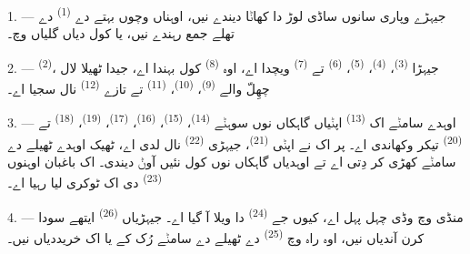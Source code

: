 %

\VUsaut{4.0mm}
\VUsaut{3.0mm}

\VUsaut{3.0mm}

1. --- جیہڑے وپاری سانوں ساڈی لوڑ دا کھاݨا دیندے نیں، اوہناں وچوں بہتے
 دے  \textsuperscript{(1)} دے تھلے جمع رہندے نیں، یا
کول دیاں گلیاں وچ۔

2. ---  \textsuperscript{(2)}، جیہڑا 
\textsuperscript{(3)}،  \textsuperscript{(4)}، 
\textsuperscript{(5)}،  \textsuperscript{(6)} تے
 \textsuperscript{(7)} ویچدا اے، اوہ 
\textsuperscript{(8)} کول بہندا اے، جیدا ٹھیلا لال چھِلّ والے
 \textsuperscript{(9)}، 
\textsuperscript{(10)}،  \textsuperscript{(11)} تے تازے
 \textsuperscript{(12)} نال سجیا اے۔

3. --- اوہدے سامݨے اک  \textsuperscript{(13)} اپݨیاں
گاہکاں نوں سوہݨے  \textsuperscript{(14)}، 
\textsuperscript{(15)}،  \textsuperscript{(16)}، 
\textsuperscript{(17)}،  \textsuperscript{(19)}، 
\textsuperscript{(18)} تے  \textsuperscript{(20)} تیکر وکھاندی اے۔ پر
اک  نے اپݨی  \textsuperscript{(21)}، جیہڑی
 \textsuperscript{(22)} نال لدی اے، ٹھیک اوہدے ٹھیلے دے سامݨے
کھڑی کر دِتی اے تے اوہدیاں گاہکاں نوں کول نئیں آوݨ دیندی۔ اک باغبان اوہنوں
 \textsuperscript{(23)} دی اک ٹوکری لیا رہیا اے۔

\VUsaut{4.0mm}
\VUsaut{3.0mm}

4. --- منڈی وچ وڈی چہل پہل اے، کیوں جے  \textsuperscript{(24)} دا
ویلا آ گیا اے۔ جیہڑیاں  \textsuperscript{(26)} ایتھے سودا کرن
آندیاں نیں، اوہ راہ وچ  \textsuperscript{(25)} دے ٹھیلے دے
سامݨے رُک کے  یا اک  خریددیاں نیں۔

